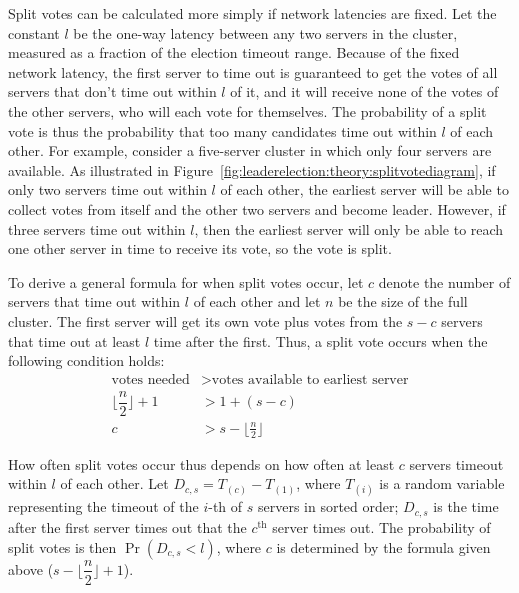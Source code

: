 Split votes can be calculated more simply if network latencies are
fixed. Let the constant $l$ be the one-way latency between any two
servers in the cluster, measured as a fraction of the election timeout
range.
Because of the fixed network latency,
the first server to time out is guaranteed to get the
votes of all servers that don't time out within $l$ of it, and it will
receive none of the votes of the other servers, who will each vote for
themselves.
The probability of a split vote is thus the probability that
too many candidates time out within $l$ of each other. For example,
consider a five-server cluster in which only four servers are available.
As illustrated in Figure~\ref{fig:leaderelection:theory:splitvotediagram},
if only two servers time out within $l$ of each other, the earliest server
will be able to collect votes from itself and the other two servers and
become leader. However, if three servers time out within $l$, then the
earliest server will only be able to reach one other server in time to
receive its vote, so the vote is split.

To derive a general formula for when split votes
occur, let $c$ denote the number of servers that time out within $l$ of
each other and let $n$ be the size of the full cluster.
The first server will get its own vote plus votes from the $s-c$ servers
that time out at least $l$ time after the first. Thus, a split vote
occurs when the following condition holds:
\begin{align*}
\text{votes needed}              &> \text{votes available to earliest server} \\
\Big\lfloor \dfrac{n}{2} \Big\rfloor + 1 &> 1 + (s - c) \\
c &> s - \Big\lfloor \frac{n}{2} \Big\rfloor
\end{align*}

How often split votes occur thus depends on how often at least $c$ servers
timeout within $l$ of each other. Let $D_{c,s} = T_{(c)} - T_{(1)}$,
where $T_{(i)}$ is a random variable representing the timeout of the
$i$-th of $s$ servers in sorted order; $D_{c,s}$ is the time after the
first server times out that the $c^\text{th}$ server times out. The
probability of split votes is then $\Pr(D_{c,s} < l)$, where $c$ is
determined by the formula given above ($s - \Big\lfloor \dfrac{n}{2}
\Big\rfloor + 1$).

